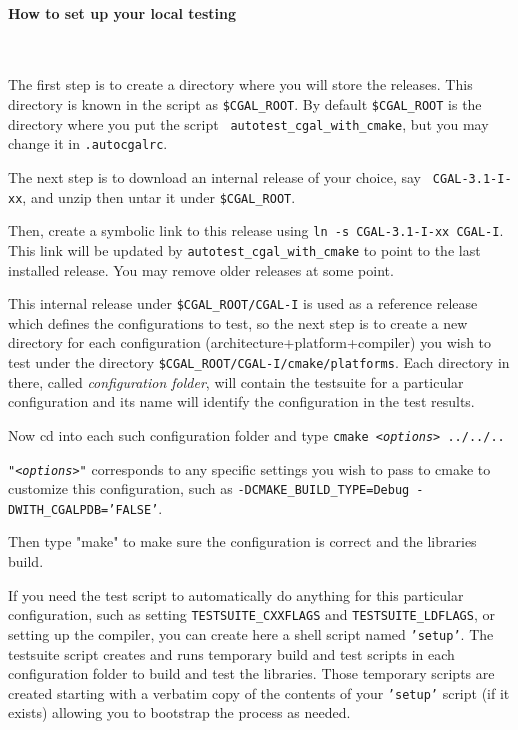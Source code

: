 \paragraph{How to set up your local testing} ~

The first step is to create a directory where you will store the releases.
This directory is known in the script as {\tt \$CGAL\_ROOT}. By default
{\tt \$CGAL\_ROOT} is the directory where you put the script {\tt
autotest\_cgal\_with\_cmake}, but you may change it in {\tt .autocgalrc}.

The next step is to download an internal release of your choice, say {\tt
CGAL-3.1-I-xx}, and unzip then untar it under {\tt \$CGAL\_ROOT}.

Then, create a symbolic link to this release using {\tt ln -s CGAL-3.1-I-xx
CGAL-I}. This link will be updated by {\tt autotest\_cgal\_with\_cmake} to point to the
last installed release.  You may remove older releases at some point.

This internal release under {\tt \$CGAL\_ROOT/CGAL-I} is used as a reference
release which defines the configurations to test, so the next step is to
create a new directory for each configuration (architecture+platform+compiler)
you wish to test under the directory {\tt \$CGAL\_ROOT/CGAL-I/cmake/platforms}.
Each directory in there, called {\em configuration folder}, will contain the testsuite 
for a particular configuration and its name will identify the configuration 
in the test results.

Now cd into each such configuration folder and type 
{\tt cmake {\em <options>} ../../..} 

{\tt{\em "<options>"}} corresponds to any specific settings you wish to
pass to cmake to customize this configuration, 
such as {\tt -DCMAKE\_BUILD\_TYPE=Debug -DWITH\_CGALPDB='FALSE'}.

Then type "make" to make sure the configuration is correct and the 
libraries build.

If you need the test script to automatically do anything for this particular configuration,
such as setting {\tt TESTSUITE\_CXXFLAGS} and {\tt TESTSUITE\_LDFLAGS}, or setting up 
the compiler, you can create here a shell script named {\tt 'setup'}. The testsuite script 
creates and runs temporary build and test scripts in each configuration folder to build and test the libraries. 
Those temporary scripts are created starting with a verbatim copy of the contents of your {\tt 'setup'} 
script (if it exists) allowing you to bootstrap the process as needed.

